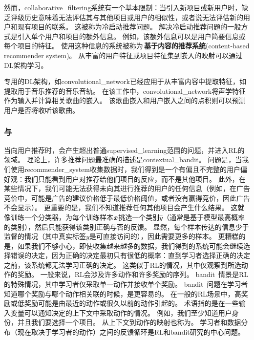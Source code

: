 然而，\gls{collaborative_filtering}系统有一个基本限制：当引入新项目或新用户时，缺乏评级历史意味着无法评估其与其他项目或用户的相似性，或者说无法评估新的用户和现有项目的联系。
这被称为冷启动推荐问题。
解决冷启动推荐问题的一般方式是引入单个用户和项目的额外信息。
例如，该额外信息可以是用户简要信息或每个项目的特征。
使用这种信息的系统被称为\,\textbf{基于内容的推荐系统}(content-based recommender system)。
从丰富的用户特征或项目特征集到嵌入的映射可以通过\gls{DL}架构学习\citep{Huang-et-al-2013,Elkahky-et-al-2015}。

专用的\gls{DL}架构，如\gls{convolutional_network}已经应用于从丰富内容中提取特征，如提取用于音乐推荐的音乐音轨\citep{vandenOord-et-al-NIPS2013}。
在该工作中，\gls{convolutional_network}将声学特征作为输入并计算相关歌曲的嵌入。
该歌曲嵌入和用户嵌入之间的点积则可以预测用户是否将收听该歌曲。


\subsubsection{与}
当向用户推荐时，会产生超出普通\gls{supervised_learning}范围的问题，并进入\gls{RL}的领域。
理论上，许多推荐问题最准确的描述是\gls{contextual_bandit}\citep{Langford+Zhang-NIPS2008,Lu-et-al-2010}。
问题是，当我们使用\gls{recommender_system}收集数据时，我们得到是一个有偏且不完整的用户偏好观：我们只能看到用户对推荐给他们项目的反应，而不是其他项目。
此外，在某些情况下，我们可能无法获得未向其进行推荐的用户的任何信息（例如，在广告竞价中，可能是广告的建议价格低于最低价格阈值，或者没有赢得竞价，因此广告不会显示）。
更重要的是，我们不知道推荐任何其他项目会产生什么结果。
这就像训练一个分类器，为每个训练样本$\boldsymbol{\mathit{x}}$挑选一个类别$\hat y$（通常是基于模型最高概率的类别），然后只能获得该类别正确与否的反馈。
显然，每个样本传达的信息少于监督的情况（其中真实标签$y$是可直接访问的），因此需要更多的样本。
更糟糕的是，如果我们不够小心，即使收集越来越多的数据，我们得到的系统可能会继续选择错误的决定，因为正确的决定最初只有很低的概率：直到学习者选择正确的决定之前，该系统都无法学习正确的决定。
这类似于\gls{RL}的情况，其中仅观察到所选动作的奖励。
一般来说，\gls{RL}会涉及许多动作和许多奖励的序列。
\gls{bandit}~情景是\gls{RL}的特殊情况，其中学习者仅采取单一动作并接收单个奖励。
\gls{bandit}~问题在学习者知道哪个奖励与哪个动作相关联的时候，是更容易的。
在一般的\gls{RL}场景中，高奖励或低奖励可能是由最近的动作或很久以前的动作引起的。
术语指的是在一些输入变量可以通知决定的上下文中采取动作的情况。
例如，我们至少知道用户身份，并且我们要选择一个项目。
从上下文到动作的映射也称为。
学习者和数据分布（现在取决于学习者的动作）之间的反馈循环是\gls{RL}和\gls{bandit}研究的中心问题。

